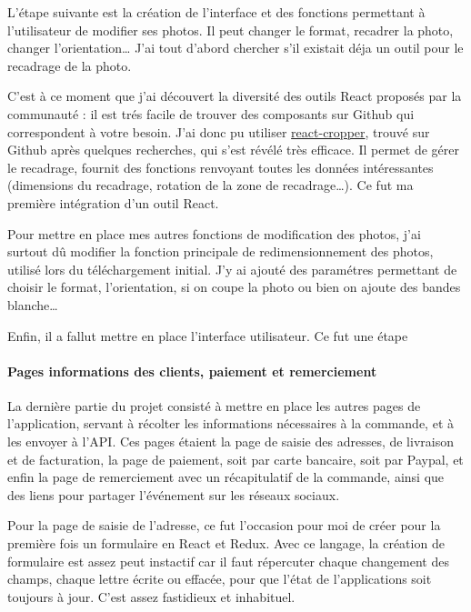 \bigskip

L'étape suivante est la création de l'interface et des fonctions
permettant à l'utilisateur de modifier ses photos. Il peut changer le
format, recadrer la photo, changer l'orientation\ldots{} J'ai tout
d'abord chercher s'il existait déja un outil pour le recadrage de la
photo.

\bigskip

C'est à ce moment que j'ai découvert la diversité des outils React
proposés par la communauté : il est trés facile de trouver des
composants sur Github qui correspondent à votre besoin. J'ai donc pu
utiliser
\href{https://github.com/roadmanfong/react-cropper}{react-cropper},
trouvé sur Github après quelques recherches, qui s'est révélé très
efficace. Il permet de gérer le recadrage, fournit des fonctions
renvoyant toutes les données intéressantes (dimensions du recadrage,
rotation de la zone de recadrage\ldots{}). Ce fut ma première
intégration d'un outil React.

\bigskip

Pour mettre en place mes autres fonctions de modification des photos,
j'ai surtout dû modifier la fonction principale de redimensionnement des
photos, utilisé lors du téléchargement initial. J'y ai ajouté des
paramétres permettant de choisir le format, l'orientation, si on coupe
la photo ou bien on ajoute des bandes blanche\ldots{}

\bigskip

Enfin, il a fallut mettre en place l'interface utilisateur. Ce fut une
étape

\paragraph{Pages informations des clients, paiement et
remerciement}\label{pages-informations-des-clients-paiement-et-remerciement}

\bigskip

La dernière partie du projet consisté à mettre en place les autres pages
de l'application, servant à récolter les informations nécessaires à la
commande, et à les envoyer à l'API. Ces pages étaient la page de saisie
des adresses, de livraison et de facturation, la page de paiement, soit
par carte bancaire, soit par Paypal, et enfin la page de remerciement
avec un récapitulatif de la commande, ainsi que des liens pour partager
l'événement sur les réseaux sociaux.

\bigskip

Pour la page de saisie de l'adresse, ce fut l'occasion pour moi de créer
pour la première fois un formulaire en React et Redux. Avec ce langage,
la création de formulaire est assez peut instactif car il faut
répercuter chaque changement des champs, chaque lettre écrite ou
effacée, pour que l'état de l'applications soit toujours à jour. C'est
assez fastidieux et inhabituel.

